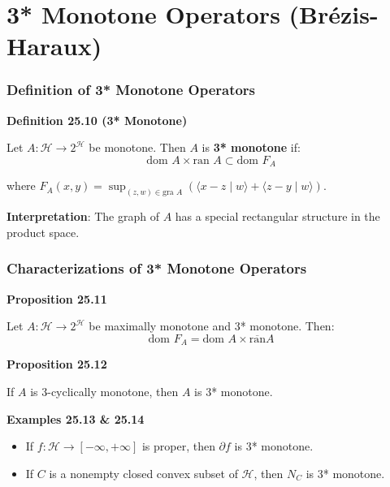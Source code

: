 \documentclass[aspectratio=169,10pt]{beamer}
\begin{document}
\section{3* Monotone Operators (Brézis-Haraux)}

\begin{frame}
  \frametitle{Definition of 3* Monotone Operators}

  \textbf{Definition 25.10 (3* Monotone)}

  Let $A: \mathcal{H} \to 2^{\mathcal{H}}$ be monotone. Then $A$ is \textbf{3* monotone} if:
  $$\text{dom } A \times \text{ran } A \subset \text{dom } F_A$$

  where $F_A(x, y) = \sup_{(z,w) \in \text{gra } A} (\langle x - z \mid w \rangle + \langle z - y \mid w \rangle)$.

  \vspace{0.3cm}

  \textbf{Interpretation}: The graph of $A$ has a special rectangular structure in the product space.

\end{frame}

\begin{frame}
  \frametitle{Characterizations of 3* Monotone Operators}

  \textbf{Proposition 25.11}

  Let $A: \mathcal{H} \to 2^{\mathcal{H}}$ be maximally monotone and 3* monotone. Then:
  $$\text{dom } F_A = \text{dom } A \times \overline{\text{ran}} A$$

  \vspace{0.3cm}

  \textbf{Proposition 25.12}

  If $A$ is 3-cyclically monotone, then $A$ is 3* monotone.

  \vspace{0.3cm}

  \textbf{Examples 25.13 \& 25.14}

  \begin{itemize}
    \item If $f: \mathcal{H} \to [-\infty, +\infty]$ is proper, then $\partial f$ is 3* monotone.
    \item If $C$ is a nonempty closed convex subset of $\mathcal{H}$, then $N_C$ is 3* monotone.
  \end{itemize}

\end{frame}
\end{document}
